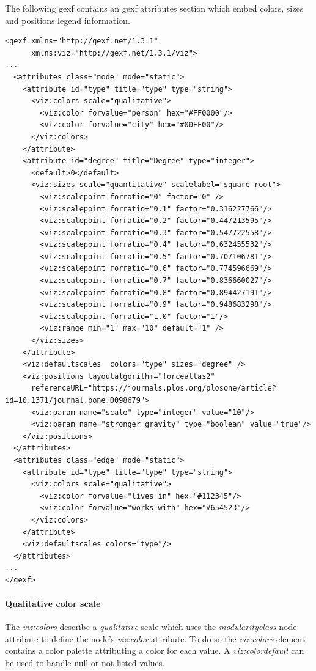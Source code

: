\documentclass[a4paper,10pt]{article}
\begin{document}
The following gexf contains an gexf attributes section which embed colors, sizes and positions legend information.

\lstset{ style=gexf }
\begin{lstlisting}[caption={VIZ Scales},label=vizscales]
<gexf xmlns="http://gexf.net/1.3.1"
      xmlns:viz="http://gexf.net/1.3.1/viz">
...
  <attributes class="node" mode="static">
    <attribute id="type" title="type" type="string">
      <viz:colors scale="qualitative">
        <viz:color forvalue="person" hex="#FF0000"/>
        <viz:color forvalue="city" hex="#00FF00"/>
      </viz:colors>
    </attribute>
    <attribute id="degree" title="Degree" type="integer">
      <default>0</default>
      <viz:sizes scale="quantitative" scalelabel="square-root">
        <viz:scalepoint forratio="0" factor="0" />
        <viz:scalepoint forratio="0.1" factor="0.316227766"/>
        <viz:scalepoint forratio="0.2" factor="0.447213595"/>
        <viz:scalepoint forratio="0.3" factor="0.547722558"/>
        <viz:scalepoint forratio="0.4" factor="0.632455532"/>
        <viz:scalepoint forratio="0.5" factor="0.707106781"/>
        <viz:scalepoint forratio="0.6" factor="0.774596669"/>
        <viz:scalepoint forratio="0.7" factor="0.836660027"/>
        <viz:scalepoint forratio="0.8" factor="0.894427191"/>
        <viz:scalepoint forratio="0.9" factor="0.948683298"/>
        <viz:scalepoint forratio="1.0" factor="1"/>
        <viz:range min="1" max="10" default="1" />
      </viz:sizes>
    </attribute>
    <viz:defaultscales  colors="type" sizes="degree" />
    <viz:positions layoutalgorithm="forceatlas2" 
      referenceURL="https://journals.plos.org/plosone/article?id=10.1371/journal.pone.0098679">
      <viz:param name="scale" type="integer" value="10"/>
      <viz:param name="stronger gravity" type="boolean" value="true"/>
    </viz:positions>
  </attributes>
  <attributes class="edge" mode="static">
    <attribute id="type" title="type" type="string">
      <viz:colors scale="qualitative">
        <viz:color forvalue="lives in" hex="#112345"/>
        <viz:color forvalue="works with" hex="#654523"/>
      </viz:colors>
    </attribute>
    <viz:defaultscales colors="type"/>
  </attributes>
...
</gexf>
\end{lstlisting}

\paragraph{Qualitative color scale} The \textit{viz:colors} describe a \textit{qualitative} scale which uses the \textit{modularityclass} node attribute to define the node's \textit{viz:color} attribute.
To do so the \textit{viz:colors} element contains a color palette attributing a color for each value. A \textit{viz:colordefault} can be used to handle null or not listed values.
\end{document}
